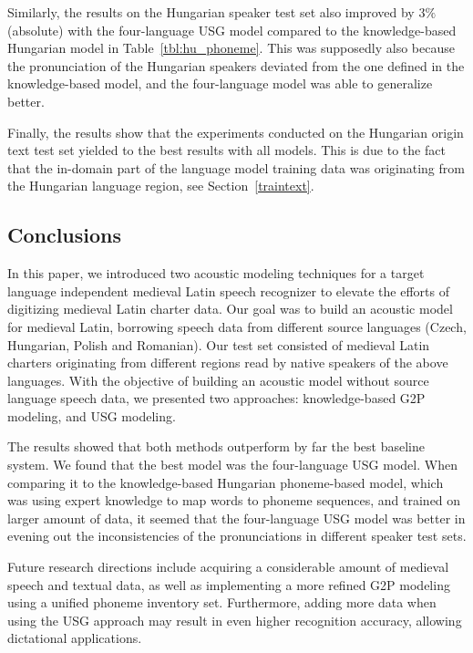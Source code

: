 \documentclass[runningheads,a4paper]{llncs}
\begin{document}
Similarly, the results on the Hungarian speaker test set also improved by $3\%$ (absolute) with the four-language USG model compared to the knowledge-based Hungarian model in Table~\ref{tbl:hu_phoneme}.
This was supposedly also because the pronunciation of the Hungarian speakers deviated from the one defined in the knowledge-based model, and the four-language model was able to generalize better. 

Finally, the results show that the experiments conducted on the Hungarian origin text test set yielded to the best results with all models.
This is due to the fact that the in-domain part of the language model training data was originating from the Hungarian language region, see Section~\ref{traintext}.
\subsection{Conclusions}
In this paper, we introduced two acoustic modeling techniques for a target language independent medieval Latin speech recognizer to elevate the efforts of digitizing medieval Latin charter data.
Our goal was to build an acoustic model for medieval Latin, borrowing speech data from different source languages (Czech, Hungarian, Polish and Romanian).
Our test set consisted of medieval Latin charters originating from different regions read by native speakers of the above languages.
With the objective of building an acoustic model without source language speech data, we presented two approaches: knowledge-based G2P modeling, and USG modeling.

The results showed that both methods outperform by far the best baseline system. 
We found that the best model was the four-language USG model.
When comparing it to the knowledge-based Hungarian phoneme-based model, which was using expert knowledge to map words to phoneme sequences, and trained on larger amount of data, it seemed that the four-language USG model was better in evening out the inconsistencies of the pronunciations in different speaker test sets.

Future research directions include acquiring a considerable amount of medieval speech and textual data, as well as implementing a more refined G2P modeling using a unified phoneme inventory set.
Furthermore, adding more data when using the USG approach may result in even higher recognition accuracy, allowing dictational applications.



\end{document}
